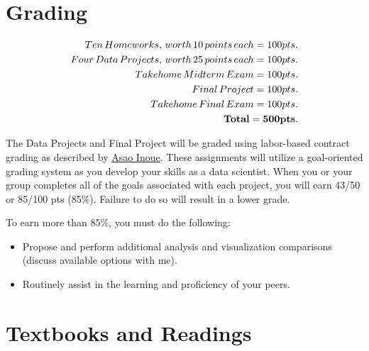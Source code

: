 \documentclass[11pt]{article} %
\begin{document}
\section{Grading}

  \begin{align*}
    Ten \, Homeworks, \, worth \, 10 \, points \, each = 100 pts.\\
    Four \, Data \, Projects, \, worth \, 25 \, points \, each = 100 pts.\\
    Takehome \, Midterm \, Exam = 100 pts.\\
    Final \, Project = 100 pts.\\
    Takehome \, Final \, Exam = 100 pts.\\
    {\bf Total = 500 pts.}
  \end{align*}

  The Data Projects and Final Project will be graded using labor-based contract grading as described by \href{http://www.translingualwriting.com/resources/Inoue\%20Contract.pdf}{Asao Inoue}. These assignments will utilize a goal-oriented grading system as you develop your skills as a data scientist.  When you or your group completes all of the goals associated with each project, you will earn 43/50 or 85/100 pts (85\%). Failure to do so will result in a lower grade.

To earn more than 85\%, you must do the following:
\begin{itemize}
  \item Propose and perform additional analysis and visualization comparisons (discuss available options with me).
  \item Routinely assist in the learning and proficiency of your peers.
\end{itemize}


\section{Textbooks and Readings}
\end{document}

